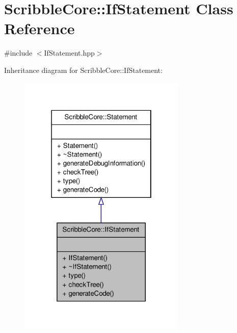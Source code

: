 \hypertarget{class_scribble_core_1_1_if_statement}{\section{Scribble\-Core\-:\-:If\-Statement Class Reference}
\label{class_scribble_core_1_1_if_statement}
}


{\ttfamily \#include $<$If\-Statement.\-hpp$>$}



Inheritance diagram for Scribble\-Core\-:\-:If\-Statement\-:
\nopagebreak
\begin{figure}[H]
\begin{center}
\leavevmode
\includegraphics[width=226pt]{class_scribble_core_1_1_if_statement__inherit__graph}
\end{center}
\end{figure}


